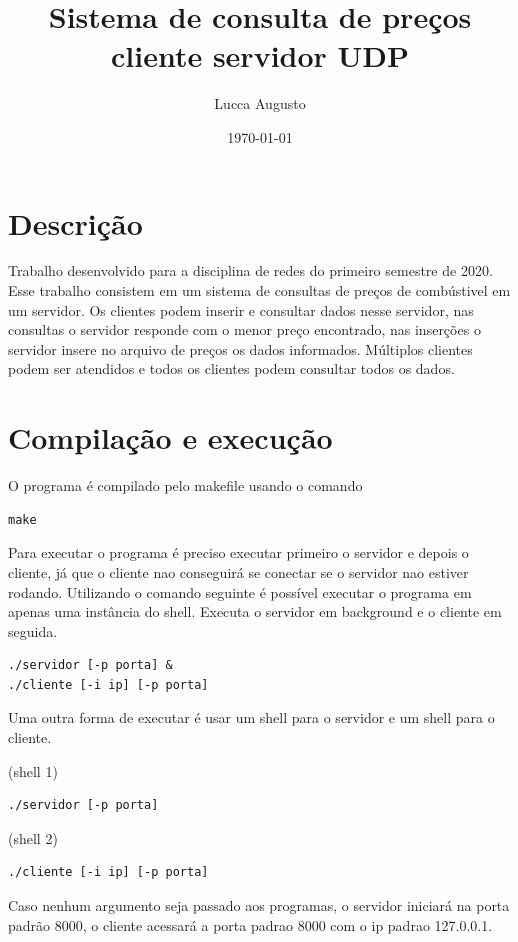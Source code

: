 \documentclass[11pt]{article}
\title{Sistema de consulta de preços cliente servidor UDP}
\author {Lucca Augusto}
\date{\today}
\begin{document}
\maketitle

\section{Descrição}
Trabalho desenvolvido para a disciplina de redes do primeiro semestre de 2020.
Esse trabalho consistem em um sistema de consultas de preços de combústivel em um servidor. Os clientes podem inserir e consultar dados nesse servidor, nas consultas o servidor responde com o menor preço encontrado, nas inserções o servidor insere no arquivo de preços os dados informados. Múltiplos clientes podem ser atendidos e todos os clientes podem consultar todos os dados.

\section{Compilação e execução}
O programa é compilado pelo makefile usando o comando

\begin{lstlisting}
make
\end{lstlisting}

Para executar o programa é preciso executar primeiro o servidor e depois o cliente, já que o cliente nao conseguirá se conectar se o servidor nao estiver rodando.
Utilizando o comando seguinte é possível executar o programa em apenas uma instância do shell. Executa o servidor em background e o cliente em seguida.

\begin{lstlisting}
./servidor [-p porta] &
./cliente [-i ip] [-p porta]
\end{lstlisting}

Uma outra forma de executar é usar um shell para o servidor e um shell para o cliente.

(shell 1)
\begin{lstlisting}
./servidor [-p porta]
\end{lstlisting}


(shell 2)
\begin{lstlisting}
./cliente [-i ip] [-p porta]
\end{lstlisting}

Caso nenhum argumento seja passado aos programas, o servidor iniciará na porta padrão 8000, o cliente acessará a porta padrao 8000 com o ip padrao 127.0.0.1.
\end{document}
